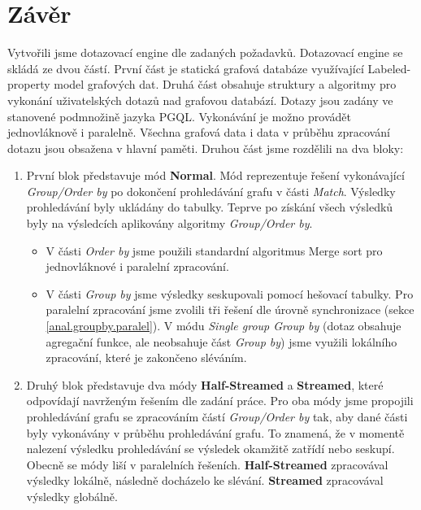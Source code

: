 \chapter*{Závěr}

Vytvořili jsme dotazovací engine dle zadaných požadavků.
Dotazovací engine se skládá ze dvou částí.
První část je statická grafová databáze využívající Labeled-property model grafových dat. 
Druhá část obsahuje struktury a algoritmy pro vykonání uživatelských dotazů nad grafovou databází.
Dotazy jsou zadány ve stanovené podmnožině jazyka PGQL.
Vykonávání je možno provádět jednovláknově i paralelně.
Všechna grafová data i data v průběhu zpracování dotazu jsou obsažena v hlavní paměti.
Druhou část jsme rozdělili na dva bloky:
\begin{enumerate}
\item
První blok představuje mód \textbf{Normal}.
Mód reprezentuje řešení vykonávající \textit{Group/Order by} po dokončení prohledávání grafu v části \textit{Match}.
Výsledky prohledávání byly ukládány do tabulky.
Teprve po získání všech výsledků byly na výsledcích aplikovány algoritmy \textit{Group/Order by}.
\begin{itemize}
\item V části \textit{Order by} jsme použili standardní algoritmus Merge sort pro jednovláknové i paralelní zpracování.
\item V části \textit{Group by} jsme výsledky seskupovali pomocí hešovací tabulky.
Pro paralelní zpracování jsme zvolili tři řešení dle úrovně synchronizace (sekce \ref{anal.groupby.paralel}).
V módu \textit{Single group Group by} (dotaz obsahuje agregační funkce, ale neobsahuje část \textit{Group by}) jsme využili lokálního zpracování, které je zakončeno sléváním.
\end{itemize}

\item
Druhý blok představuje dva módy \textbf{Half-Streamed} a \textbf{Streamed}, které odpovídají navrženým řešením dle zadání práce.
Pro oba módy jsme propojili prohledávání grafu se zpracováním částí \textit{Group/Order by} tak, aby dané části byly vykonávány v průběhu prohledávání grafu.
To znamená, že v momentě nalezení výsledku prohledávání se výsledek okamžitě zatřídí nebo seskupí.
Obecně se módy liší v paralelních řešeních. 
\textbf{Half-Streamed} zpracovával výsledky lokálně, následně docházelo ke slévání.
\textbf{Streamed} zpracovával výsledky globálně.
\begin{itemize}


\end{itemize}
\end{enumerate}
